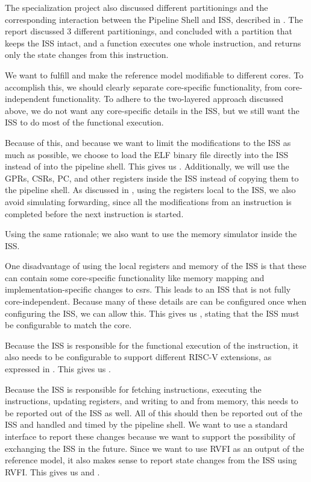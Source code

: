 The specialization project also discussed different partitionings and the corresponding interaction between the Pipeline Shell and ISS, described in . The report discussed 3 different partitionings, and concluded with a partition that keeps the ISS intact, and a  function executes one whole instruction, and returns only the state changes from this instruction. 

We want to fulfill  and make the reference model modifiable to different cores. To accomplish this, we should clearly separate core-specific functionality, from core-independent functionality. To adhere to the two-layered approach discussed above, we do not want any core-specific details in the ISS, but we still want the ISS to do most of the functional execution. 

Because of this, and because we want to limit the modifications to the ISS as much as possible, we choose to load the ELF binary file directly into the ISS instead of into the pipeline shell. This gives us \textbf{}. Additionally, we will use the GPRs, CSRs, PC, and other registers inside the ISS instead of copying them to the pipeline shell. As discussed in , using the registers local to the ISS, we also avoid simulating forwarding, since all the modifications from an instruction is completed before the next instruction is started.

Using the same rationale; we also want to use the memory simulator inside the ISS.

One disadvantage of using the local registers and memory of the ISS is that these can contain some core-specific functionality like memory mapping and implementation-specific changes to \acrshort{csr}s. This leads to an ISS that is not fully core-independent. Because many of these details are can be configured once when configuring the ISS, we can allow this. This gives us \textbf{}, stating that the ISS must be configurable to match the core.

Because the ISS is responsible for the functional execution of the instruction, it also needs to be configurable to support different RISC-V extensions, as expressed in \textbf{}. This gives us \textbf{}. 


Because the ISS is responsible for fetching instructions, executing the instructions, updating registers, and writing to and from memory, this needs to be reported out of the ISS as well. All of this should then be reported out of the ISS and handled and timed by the pipeline shell. We want to use a standard interface to report these changes because we want to support the possibility of exchanging the ISS in the future. Since we want to use RVFI as an output of the reference model, it also makes sense to report state changes from the ISS using RVFI. This gives us \textbf{} and \textbf{}.

